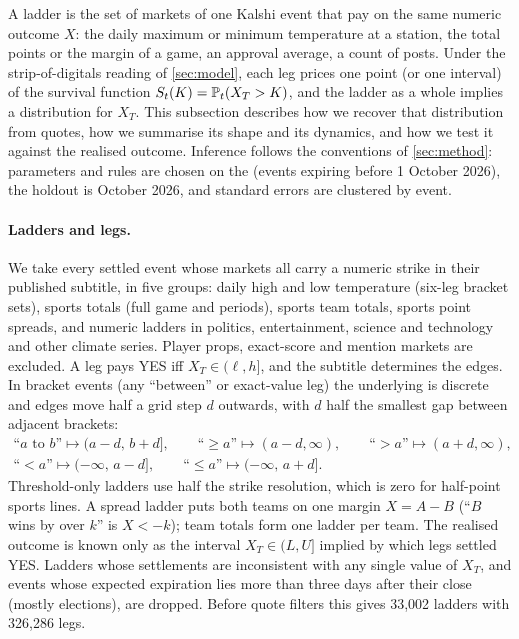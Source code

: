 A ladder is the set of markets of one Kalshi event that pay on the same numeric outcome $X$: the
daily maximum or minimum temperature at a station, the total points or the margin of a game, an
approval average, a count of posts. Under the strip-of-digitals reading of \cref{sec:model}, each
leg prices one point (or one interval) of the survival function $S_t(K)=\mathbb{P}_t(X_T>K)$, and the
ladder as a whole implies a distribution for $X_T$. This subsection describes how we recover that
distribution from quotes, how we summarise its shape and its dynamics, and how we test it against
the realised outcome. Inference follows the conventions of \cref{sec:method}: parameters and rules
are chosen on the \estim{} (events expiring before 1 October 2026), the holdout is October 2026,
and standard errors are clustered by event.

\paragraph{Ladders and legs.}
We take every settled event whose markets all carry a numeric strike in their published
subtitle, in five groups: daily high and low temperature (six-leg bracket sets), sports totals
(full game and periods), sports team totals, sports point spreads, and numeric ladders in politics,
entertainment, science and technology and other climate series. Player props, exact-score and
mention markets are excluded. A leg pays YES iff $X_T\in(\ell,h]$, and the subtitle determines the
edges. In bracket events (any ``between'' or exact-value leg) the underlying is discrete and edges
move half a grid step $d$ outwards, with $d$ half the smallest gap between adjacent brackets:
\begin{equation}\label{eq:lad-edges}
\begin{gathered}
  \text{``}a\text{ to }b\text{''}\mapsto(a-d,\,b+d],\qquad
  \text{``}{\ge}a\text{''}\mapsto(a-d,\infty),\qquad
  \text{``}{>}a\text{''}\mapsto(a+d,\infty),\\
  \text{``}{<}a\text{''}\mapsto(-\infty,\,a-d],\qquad
  \text{``}{\le}a\text{''}\mapsto(-\infty,\,a+d].
\end{gathered}
\end{equation}
Threshold-only ladders use half the strike resolution, which is zero for half-point sports lines.
A spread ladder puts both teams on one margin $X=A-B$ (``$B$ wins by over $k$'' is $X<-k$); team
totals form one ladder per team. The realised outcome is known only as the interval
$X_T\in(L,U]$ implied by which legs settled YES. Ladders whose settlements are inconsistent with
any single value of $X_T$, and events whose expected expiration lies more than three days after
their close (mostly elections), are dropped. Before quote filters this gives 33,002 ladders with
326,286 legs. %

